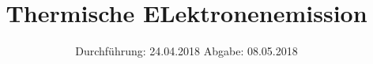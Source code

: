 

\subject{Versuch 504}
\title{Thermische ELektronenemission}
\date{%
  Durchführung: 24.04.2018
  \hspace{3em}
  Abgabe: 08.05.2018
}



\maketitle
\thispagestyle{empty}
\tableofcontents
\newpage






\printbibliography{}


